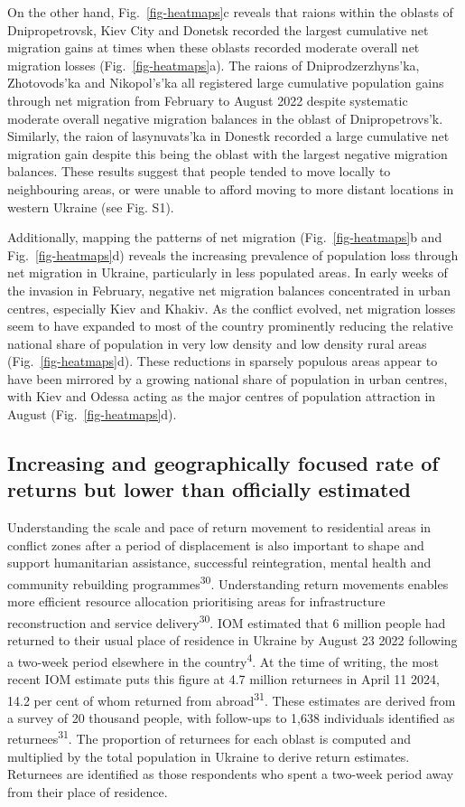\documentclass[
  11pt,
]{article}
\begin{document}
On the other hand, Fig.~\ref{fig-heatmaps}c reveals that raions within
the oblasts of Dnipropetrovsk, Kiev City and Donetsk recorded the
largest cumulative net migration gains at times when these oblasts
recorded moderate overall net migration losses
(Fig.~\ref{fig-heatmaps}a). The raions of Dniprodzerzhyns'ka,
Zhotovods'ka and Nikopol's'ka all registered large cumulative population
gains through net migration from February to August 2022 despite
systematic moderate overall negative migration balances in the oblast of
Dnipropetrovs'k. Similarly, the raion of lasynuvats'ka in Donestk
recorded a large cumulative net migration gain despite this being the
oblast with the largest negative migration balances. These results
suggest that people tended to move locally to neighbouring areas, or
were unable to afford moving to more distant locations in western
Ukraine (see Fig. S1).

Additionally, mapping the patterns of net migration
(Fig.~\ref{fig-heatmaps}b and Fig.~\ref{fig-heatmaps}d) reveals the
increasing prevalence of population loss through net migration in
Ukraine, particularly in less populated areas. In early weeks of the
invasion in February, negative net migration balances concentrated in
urban centres, especially Kiev and Khakiv. As the conflict evolved, net
migration losses seem to have expanded to most of the country
prominently reducing the relative national share of population in very
low density and low density rural areas (Fig.~\ref{fig-heatmaps}d).
These reductions in sparsely populous areas appear to have been mirrored
by a growing national share of population in urban centres, with Kiev
and Odessa acting as the major centres of population attraction in
August (Fig.~\ref{fig-heatmaps}d).

\subsection{Increasing and geographically focused rate of returns but
lower than officially estimated}\label{sec-return}

Understanding the scale and pace of return movement to residential areas
in conflict zones after a period of displacement is also important to
shape and support humanitarian assistance, successful reintegration,
mental health and community rebuilding programmes\textsuperscript{30}.
Understanding return movements enables more efficient resource
allocation prioritising areas for infrastructure reconstruction and
service delivery\textsuperscript{30}. IOM estimated that 6 million
people had returned to their usual place of residence in Ukraine by
August 23 2022 following a two-week period elsewhere in the
country\textsuperscript{4}. At the time of writing, the most recent IOM
estimate puts this figure at 4.7 million returnees in April 11 2024,
14.2 per cent of whom returned from abroad\textsuperscript{31}. These
estimates are derived from a survey of 20 thousand people, with
follow-ups to 1,638 individuals identified as
returnees\textsuperscript{31}. The proportion of returnees for each
oblast is computed and multiplied by the total population in Ukraine to
derive return estimates. Returnees are identified as those respondents
who spent a two-week period away from their place of residence.
\end{document}
